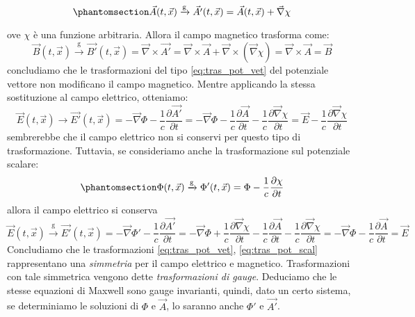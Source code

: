 \begin{equation}\phantomsection\label{eq:tras_pot_vet}
   \Vec{A}(t,\Vec{x})
   \xrightarrow[\text{}]{\text{g}}
  \Vec{A'}(t,\Vec{x})
    =\Vec{A}(t,\Vec{x})
    +\Vec{\nabla}\chi
\end{equation}
ove $\chi$ è una funzione arbitraria. Allora il campo magnetico trasforma come:
\begin{equation}
   \Vec{B}(t,\Vec{x})
   \xrightarrow[\text{}]{\text{g}}
  \Vec{B'}(t,\Vec{x})=\Vec{\nabla}\times\Vec{A'}
    =\Vec{\nabla}\times\Vec{A}
    +\Vec{\nabla}\times(\Vec{\nabla}\chi)= \Vec{\nabla}\times\Vec{A}=\Vec{B}
\end{equation}
concludiamo che le trasformazioni del tipo \eqref{eq:tras_pot_vet} del potenziale vettore non modificano il campo magnetico. Mentre applicando la stessa sostituzione al campo elettrico, otteniamo:
\begin{equation*}
   \Vec{E}(t,\Vec{x})
   \xrightarrow[\text{}]{\text{}}
  \Vec{E'}(t,\Vec{x})=-\Vec{\nabla}\Phi-\dfrac{1}{c}\dfrac{\partial \Vec{A'}}{\partial t}
    =-\Vec{\nabla}\Phi-\dfrac{1}{c}\dfrac{\partial \Vec{A}}{\partial t}-\dfrac{1}{c}\dfrac{\partial \Vec{\nabla}\chi}{\partial t}=\Vec{E}-\dfrac{1}{c}\dfrac{\partial \Vec{\nabla}\chi}{\partial t}
\end{equation*}
sembrerebbe che il campo elettrico non si conservi per questo tipo di trasformazione. Tuttavia, se consideriamo anche la trasformazione sul potenziale scalare:
\begin{equation}\phantomsection\label{eq:tras_pot_scal}
   \Phi(t,\Vec{x})
   \xrightarrow[\text{}]{\text{g}}
  \Phi'(t,\Vec{x})
    =\Phi
    -\dfrac{1}{c}\dfrac{\partial \chi}{\partial t}
\end{equation}
allora il campo elettrico si conserva
\begin{equation}
   \Vec{E}(t,\Vec{x})
   \xrightarrow[\text{}]{\text{g}}
  \Vec{E'}(t,\Vec{x})=-\Vec{\nabla}\Phi'-\dfrac{1}{c}\dfrac{\partial \Vec{A'}}{\partial t}
    =-\Vec{\nabla}\Phi+\dfrac{1}{c}\dfrac{\partial \Vec{\nabla}\chi}{\partial t}-\dfrac{1}{c}\dfrac{\partial \Vec{A}}{\partial t}-\dfrac{1}{c}\dfrac{\partial \Vec{\nabla}\chi}{\partial t}=-\Vec{\nabla}\Phi-\dfrac{1}{c}\dfrac{\partial \Vec{A}}{\partial t}=\Vec{E}
\end{equation}
Concludiamo che le trasformazioni \eqref{eq:tras_pot_vet}, \eqref{eq:tras_pot_scal} rappresentano una \textit{simmetria} per il campo elettrico e magnetico. Trasformazioni con tale simmetrica vengono dette \textit{trasformazioni di gauge}. Deduciamo che le stesse equazioni di Maxwell sono gauge invarianti, quindi, dato un certo sistema, se determiniamo le soluzioni di $\Phi$ e $\Vec{A}$, lo saranno anche $\Phi'$ e $\Vec{A'}$.

